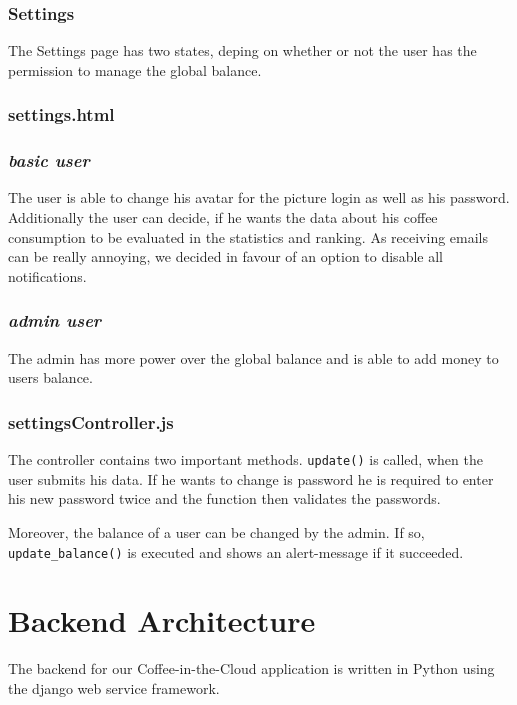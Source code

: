 \subsubsection{Settings}\label{settings-1}

The Settings page has two states, deping on whether or not the user has
the permission to manage the global balance.

\subsubsection*{settings.html}

\subsubsection*{\emph{basic user}}

The user is able to change his avatar for the picture login as well as
his password. Additionally the user can decide, if he wants the data
about his coffee consumption to be evaluated in the statistics and
ranking. As receiving emails can be really annoying, we decided in favour
of an option to disable all notifications.

\subsubsection*{\emph{admin user}}

The admin has more power over the global balance and is able to add
money to users balance.

\subsubsection*{settingsController.js}

The controller contains two important methods. \texttt{update()} is
called, when the user submits his data. If he wants to change is
password he is required to enter his new password twice and the function
then validates the passwords.

Moreover, the balance of a user can be changed by the admin. If so,
\texttt{update\_balance()} is executed and shows an alert-message if it
succeeded.

\newpage
\newpage
\section{Backend Architecture}\label{backend-architecture}

The backend for our Coffee-in-the-Cloud application is written in Python
using the django web service framework.

